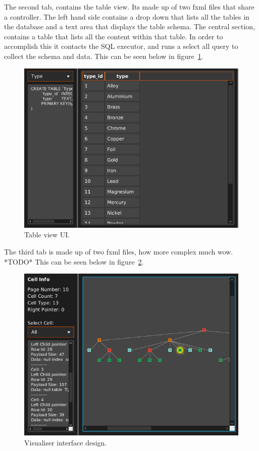 The second tab, contains the table view. Its made up of two fxml files that share a controller. The left hand side contains a drop down that lists all the tables in the database and a text area that displays the table schema. The central section, contains a table that lists all the content within that table. In order to accomplish this it contacts the SQL executor, and runs a select all query to collect the schema and data. This can be seen below in figure~\ref{fig:imp_ui_table}.

\begin{figure}[H]
	\centering
	\includegraphics[scale=0.32]{images/ui_table_final.png}
	\caption{Table view UI.}
	\label{fig:imp_ui_table}
\end{figure}

The third tab is made up of two fxml files, how more complex much wow. *TODO* This can be seen below in figure~\ref{fig:imp_ui_vis}.

\begin{figure}[H]
	\centering
	\includegraphics[scale=0.32]{images/ui_visuliser_final.png}
	\caption{Visualiser interface design.}
	\label{fig:imp_ui_vis}
\end{figure}

